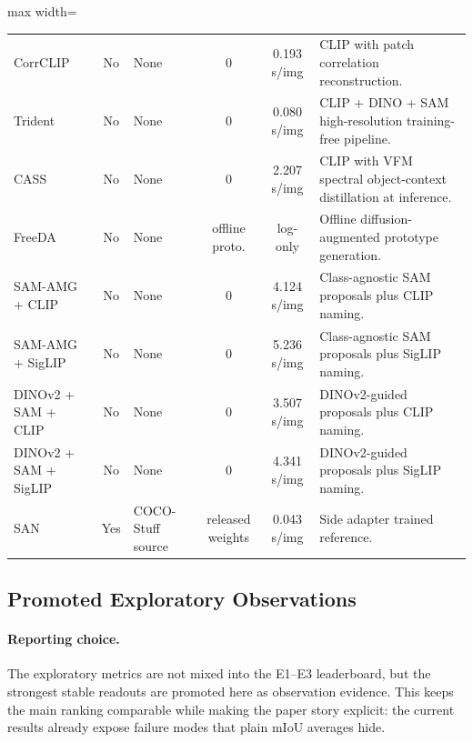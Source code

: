 \documentclass[11pt,a4paper]{article}
\begin{document}
\begin{table}[H]
\begin{adjustbox}{max width=\textwidth}
\begin{tabular}{l c p{} c c p{}}
CorrCLIP & No & None & 0 & 0.193 s/img & CLIP with patch correlation reconstruction. \\
Trident & No & None & 0 & 0.080 s/img & CLIP + DINO + SAM high-resolution training-free pipeline. \\
CASS & No & None & 0 & 2.207 s/img & CLIP with VFM spectral object-context distillation at inference. \\
FreeDA & No & None & offline proto. & log-only & Offline diffusion-augmented prototype generation. \\
SAM-AMG + CLIP & No & None & 0 & 4.124 s/img & Class-agnostic SAM proposals plus CLIP naming. \\
SAM-AMG + SigLIP & No & None & 0 & 5.236 s/img & Class-agnostic SAM proposals plus SigLIP naming. \\
DINOv2 + SAM + CLIP & No & None & 0 & 3.507 s/img & DINOv2-guided proposals plus CLIP naming. \\
DINOv2 + SAM + SigLIP & No & None & 0 & 4.341 s/img & DINOv2-guided proposals plus SigLIP naming. \\
SAN & Yes & COCO-Stuff source & released weights & 0.043 s/img & Side adapter trained reference. \\
\bottomrule
\end{tabular}
\end{adjustbox}
\end{table}


\subsection{Promoted Exploratory Observations}

\paragraph{Reporting choice.}
The exploratory metrics are not mixed into the E1--E3 leaderboard, but the strongest stable readouts are promoted here as observation evidence. This keeps the main ranking comparable while making the paper story explicit: the current results already expose failure modes that plain mIoU averages hide.
\end{document}
